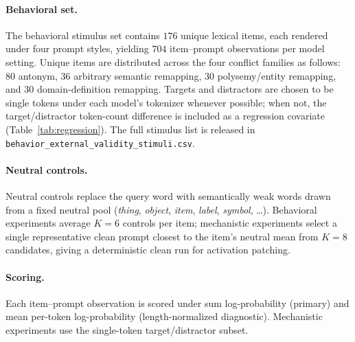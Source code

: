 \documentclass[11pt]{article}
\begin{document}
\paragraph{Behavioral set.}
The behavioral stimulus set contains $176$ unique lexical items, each rendered under four prompt
styles, yielding $704$ item--prompt observations per model setting. Unique items are distributed
across the four conflict families as follows: $80$ antonym, $36$ arbitrary semantic remapping,
$30$ polysemy/entity remapping, and $30$ domain-definition remapping. Targets and distractors
are chosen to be single tokens under each model's tokenizer whenever possible; when not, the
target/distractor token-count difference is included as a regression covariate
(Table~\ref{tab:regression}). The full stimulus list is released in
\texttt{behavior\_\allowbreak external\_\allowbreak validity\_\allowbreak stimuli.csv}.

\paragraph{Neutral controls.}
Neutral controls replace the query word with semantically weak words drawn from a fixed
neutral pool (\emph{thing}, \emph{object}, \emph{item}, \emph{label}, \emph{symbol}, \dots).
Behavioral experiments average $K{=}6$ controls per item; mechanistic experiments select a
single representative clean prompt closest to the item's neutral mean from $K{=}8$
candidates, giving a deterministic clean run for activation patching.

\paragraph{Scoring.}
Each item--prompt observation is scored under sum log-probability (primary) and mean
per-token log-probability (length-normalized diagnostic). Mechanistic experiments use the
single-token target/distractor subset.
\end{document}
